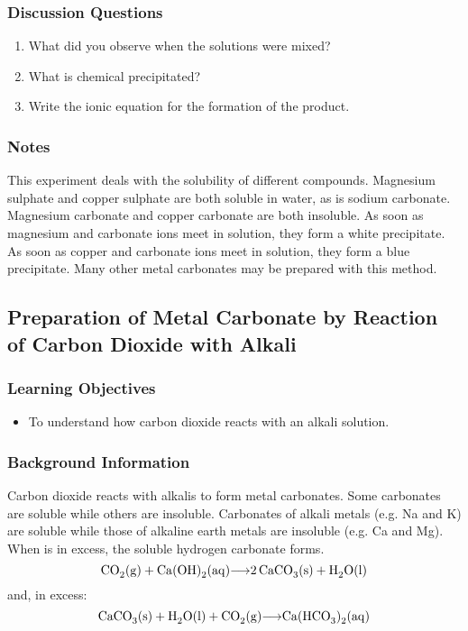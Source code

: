 \subsubsection*{Discussion Questions}
\begin{enumerate}
\item{What did you observe when the solutions were mixed?}
\item{What is chemical precipitated?}
\item{Write the ionic equation for the formation of the product.}
\end{enumerate}

\subsubsection*{Notes}
This experiment deals with the solubility of different compounds. Magnesium sulphate and copper sulphate are both soluble in water, as is sodium carbonate. Magnesium carbonate and copper carbonate are both insoluble. As soon as magnesium and carbonate ions meet in solution, they form a white precipitate. As soon as copper and carbonate ions meet in solution, they form a blue precipitate. Many other metal carbonates may be prepared with this method.

\subsection{Preparation of Metal Carbonate by Reaction of Carbon Dioxide with Alkali}

\subsubsection*{Learning Objectives}
\begin{itemize}
\item{To understand how carbon dioxide reacts with an alkali solution.}
\end{itemize}

\subsubsection*{Background Information}
Carbon dioxide reacts with alkalis to form metal carbonates. Some carbonates are soluble while others are insoluble. Carbonates of alkali metals (e.g. Na and K) are soluble while those of alkaline earth metals are insoluble (e.g. Ca and Mg). When  is in excess, the soluble hydrogen carbonate forms.
$$\ce{CO2 (g) + Ca(OH)2 (aq)$\longrightarrow$ 2CaCO3 (s) + H2O (l)}$$
and, in excess: $$\ce{CaCO3(s) + H2O(l) +  CO2(g) $\longrightarrow$ Ca(HCO3)2(aq)}$$

